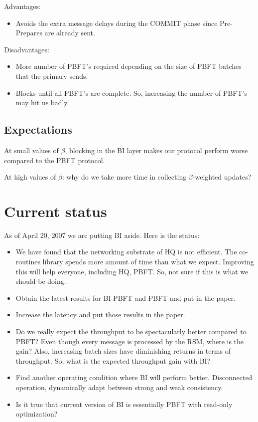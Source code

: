 Advantages:
\begin{itemize}
\item{} Avoids the extra message delays during the COMMIT phase since Pre-Prepares are already sent.
\end{itemize}

Disadvantages:
\begin{itemize}
\item{} More number of PBFT's required depending on the size of PBFT batches that the primary sends.
\item{} Blocks until all PBFT's are complete. So, increasing the number of PBFT's may hit us badly.
\end{itemize}

\subsection{Expectations}

At small values of $\beta$, blocking in the BI layer makes our protocol perform worse compared to
the PBFT protocol. 

At high values of $\beta$: why do we take more time in collecting $\beta$-weighted updates?


\section{Current status}
As of April 20, 2007 we are putting BI aside. Here is the status:

\begin{itemize}
\item{} We have found that the networking substrate of HQ is not efficient. The co-routines 
library spends more amount of time than what we expect. Improving this will help everyone,
including HQ, PBFT. So, not sure if this is what we should be doing.
\item{} Obtain the latest results for BI-PBFT and PBFT and put in the paper.
\item{} Increase the latency and put those results in the paper.
\item{} Do we really expect the throughput to be spectacularly better compared to PBFT? Even
though every message is processed by the RSM, where is the gain? Also, increasing batch sizes have
diminishing returns in terms of throughput. So, what is the expected throughput gain with BI?
\item{} Find another operating condition where BI will perform better. Disconnected operation, 
dynamically adapt between strong and weak consistency.
\item{} Is it true that current version of BI is essentially PBFT with read-only optimization?

\end{itemize}